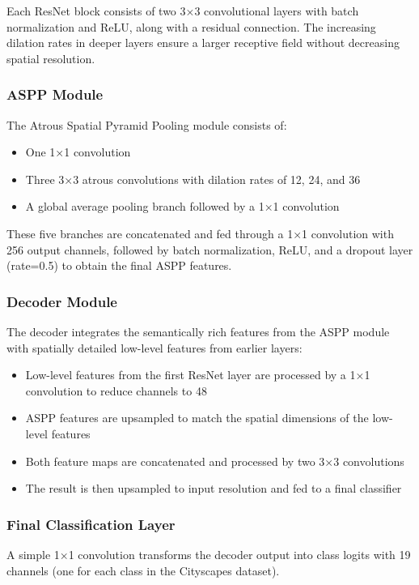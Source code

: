 \documentclass[]{article}
\begin{document}
Each ResNet block consists of two 3×3 convolutional layers with batch normalization and ReLU, along with a residual connection. The increasing dilation rates in deeper layers ensure a larger receptive field without decreasing spatial resolution.

\subsubsection{ASPP Module}
The Atrous Spatial Pyramid Pooling module consists of:
\begin{itemize}
    \item One 1×1 convolution
    \item Three 3×3 atrous convolutions with dilation rates of 12, 24, and 36
    \item A global average pooling branch followed by a 1×1 convolution
\end{itemize}

These five branches are concatenated and fed through a 1×1 convolution with 256 output channels, followed by batch normalization, ReLU, and a dropout layer (rate=0.5) to obtain the final ASPP features.

\subsubsection{Decoder Module}
The decoder integrates the semantically rich features from the ASPP module with spatially detailed low-level features from earlier layers:
\begin{itemize}
    \item Low-level features from the first ResNet layer are processed by a 1×1 convolution to reduce channels to 48
    \item ASPP features are upsampled to match the spatial dimensions of the low-level features
    \item Both feature maps are concatenated and processed by two 3×3 convolutions
    \item The result is then upsampled to input resolution and fed to a final classifier
\end{itemize}

\subsubsection{Final Classification Layer}
A simple 1×1 convolution transforms the decoder output into class logits with 19 channels (one for each class in the Cityscapes dataset).
\end{document}
